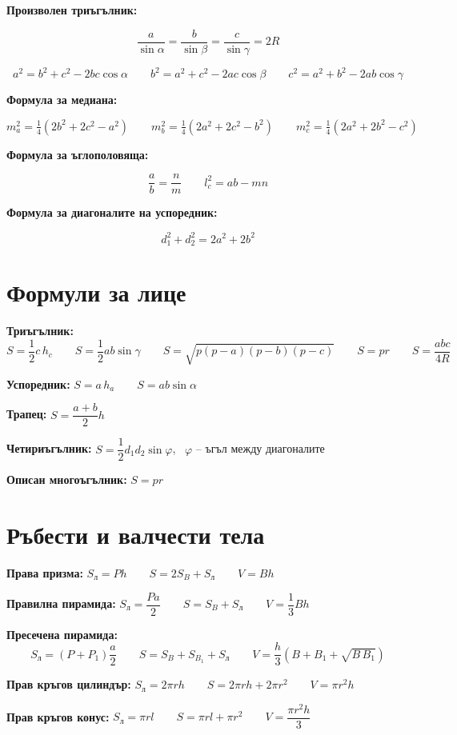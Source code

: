 \documentclass[12pt,a4paper]{article}
\begin{document}
\textbf{Произволен триъгълник:}

$$\frac{a}{\sin\alpha}=\frac{b}{\sin\beta}=\frac{c}{\sin\gamma}=2R$$

$$a^2=b^2+c^2-2bc\cos\alpha \qquad b^2=a^2+c^2-2ac\cos\beta \qquad c^2=a^2+b^2-2ab\cos\gamma$$

\textbf{Формула за медиана:}

$$m_a^2=\tfrac14(2b^2+2c^2-a^2) \qquad m_b^2=\tfrac14(2a^2+2c^2-b^2) \qquad m_c^2=\tfrac14(2a^2+2b^2-c^2)$$

\textbf{Формула за ъглополовяща:}

$$\frac{a}{b}=\frac{n}{m} \qquad l_c^2=ab-mn$$

\textbf{Формула за диагоналите на успоредник:}

$$d_1^2+d_2^2=2a^2+2b^2$$

\section{Формули за лице}

\textbf{Триъгълник:}
$$S=\frac12 c\,h_c \qquad S=\frac12 ab\sin\gamma \qquad S=\sqrt{p(p-a)(p-b)(p-c)} \qquad S=pr \qquad S=\frac{abc}{4R}$$

\textbf{Успоредник:} \quad $S=a\,h_a \qquad S=ab\sin\alpha$

\textbf{Трапец:} \quad $S=\dfrac{a+b}{2}h$

\textbf{Четириъгълник:} \quad $S=\dfrac12 d_1d_2\sin\varphi$, \ $\varphi$ -- ъгъл между диагоналите

\textbf{Описан многоъгълник:} \quad $S=pr$

\section{Ръбести и валчести тела}

\textbf{Права призма:} \quad $S_{\text{л}}=Ph \qquad S=2S_B+S_{\text{л}} \qquad V=Bh$

\textbf{Правилна пирамида:} \quad $S_{\text{л}}=\dfrac{Pa}{2} \qquad S=S_B+S_{\text{л}} \qquad V=\dfrac13 Bh$

\textbf{Пресечена пирамида:}
$$S_{\text{л}}=(P+P_1)\frac{a}{2} \qquad S=S_B+S_{B_1}+S_{\text{л}} \qquad V=\frac{h}{3}\left(B+B_1+\sqrt{B\,B_1}\right)$$

\textbf{Прав кръгов цилиндър:} \quad $S_{\text{л}}=2\pi r h \qquad S=2\pi rh+2\pi r^2 \qquad V=\pi r^2 h$

\textbf{Прав кръгов конус:} \quad $S_{\text{л}}=\pi r l \qquad S=\pi rl+\pi r^2 \qquad V=\dfrac{\pi r^2 h}{3}$
\end{document}
